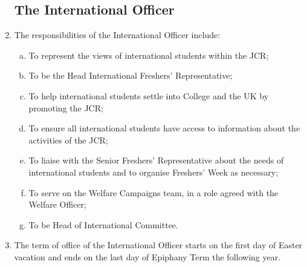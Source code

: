 \documentclass[12pt]{article}
\begin{document}
\begin{enumerate}
    \subsection{The International Officer}
    \item The responsibilities of the International Officer include:
    \begin{enumerate}[(a)]
        \item To represent the views of international students within the JCR;
        \item To be the Head International Freshers' Representative;
        \item To help international students settle into College and the UK by promoting the JCR;
        \item To ensure all international students have access to information about the activities of the JCR;
        \item To liaise with the Senior Freshers' Representative about the needs of international students and to organise Freshers' Week as necessary;
        \item To serve on the Welfare Campaigns team, in a role agreed with the Welfare Officer;
        \item To be Head of International Committee.
    \end{enumerate}
    \item The term of office of the International Officer starts on the first day of Easter vacation and ends on the last day of Epiphany Term the following year.

\end{enumerate}
\end{document}
